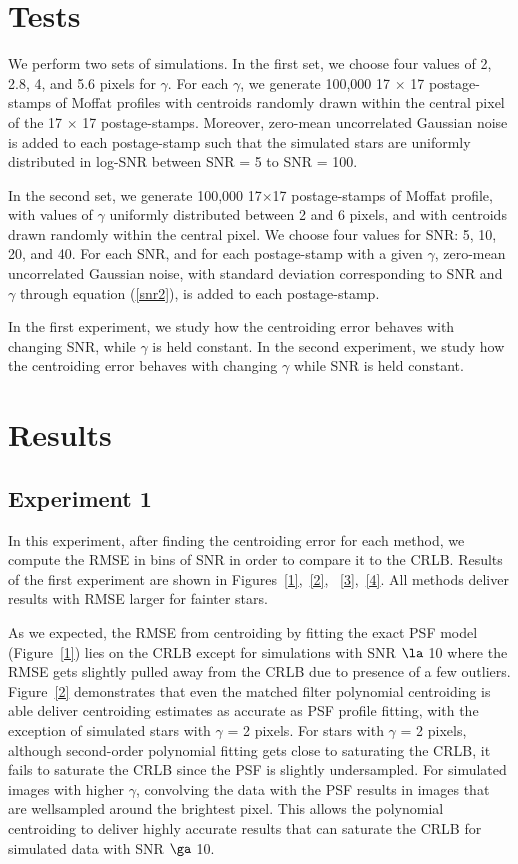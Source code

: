 \documentclass[12pt, preprint]{aastex}
\begin{document}
\section{Tests}\label{sec:data}

We perform two sets of simulations. In the first set, we choose four values of
2, 2.8, 4, and 5.6 pixels for $\gamma$. For each $\gamma$, we generate 100,000 
17 $\times$ 17 postage-stamps of Moffat profiles with centroids randomly drawn
within the central pixel of the 17 $\times$ 17 postage-stamps. Moreover, zero-mean 
uncorrelated Gaussian noise is added to each postage-stamp such that the simulated 
stars are uniformly distributed in log-SNR between SNR = 5 to SNR = 100.

In the second set, we generate 100,000 17$\times$17 postage-stamps
of Moffat profile, with values of $\gamma$ uniformly distributed 
between 2 and 6 pixels, and with centroids drawn randomly within 
the central pixel. We choose four values for SNR: 5, 10, 20, and 40. 
For each SNR, and for each postage-stamp with a given $\gamma$, 
zero-mean uncorrelated Gaussian noise, with standard deviation corresponding 
to SNR and $\gamma$ through equation (\ref{snr2}), is added to each postage-stamp.

In the first experiment, we study how the centroiding error behaves with changing
SNR, while $\gamma$ is held constant. In the second experiment, we study 
how the centroiding error behaves with changing $\gamma$ while SNR is held constant.

\section{Results}\label{sec:result}

\subsection{Experiment 1}
   
In this experiment, after finding the centroiding error for each method,
we compute the RMSE in bins of SNR in order to compare it to the CRLB. 
Results of the first experiment are shown in Figures~\ref{1},~\ref{2},
~\ref{3},~\ref{4}. All methods deliver results with RMSE larger 
for fainter stars.

As we expected, the RMSE from centroiding by fitting the exact PSF model (Figure~\ref{1})
lies on the CRLB except for simulations with SNR $\la$ 10 where the RMSE gets slightly pulled away
from the CRLB due to presence of a few outliers. Figure~\ref{2} demonstrates that even the matched filter polynomial 
centroiding is able deliver centroiding estimates as accurate as PSF profile fitting, with the exception
of simulated stars with $\gamma$ = 2 pixels. For stars with $\gamma$ = 2 pixels, although second-order polynomial
fitting gets close to saturating the CRLB, it fails to saturate the CRLB since the PSF is slightly undersampled. 
For simulated images with higher $\gamma$, convolving the
data with the PSF results in images that are wellsampled around the brightest pixel. This allows the 
polynomial centroiding to deliver highly accurate results that can saturate the CRLB for simulated
data with SNR $\ga$ 10.
\end{document}
